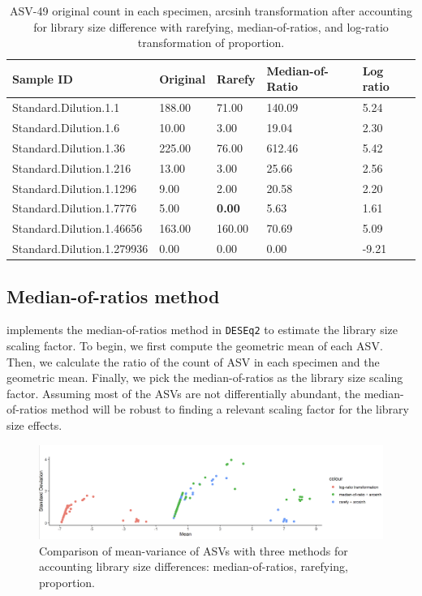 \documentclass[12pt]{article}
\begin{document}
\begin{table}[ht]
\caption{ASV-49 original count in each specimen, arcsinh transformation after accounting for library size difference with rarefying, median-of-ratios, and log-ratio transformation of proportion.}
\centering
\begin{tabular}{lllll}
  \hline
 Sample ID & Original & Rarefy & Median-of-Ratio & Log ratio \\ 
  \hline
Standard.Dilution.1.1 & 188.00 & 71.00 & 140.09 & 5.24 \\ 
  Standard.Dilution.1.6 & 10.00 & 3.00 & 19.04 & 2.30 \\ 
  Standard.Dilution.1.36 & 225.00 & 76.00 & 612.46 & 5.42 \\ 
  Standard.Dilution.1.216 & 13.00 & 3.00 & 25.66 & 2.56 \\ 
  Standard.Dilution.1.1296 & 9.00 & 2.00 & 20.58 & 2.20 \\ 
  Standard.Dilution.1.7776 & 5.00 & \textbf{0.00} & 5.63 & 1.61 \\ 
  Standard.Dilution.1.46656 & 163.00 & 160.00 & 70.69 & 5.09 \\ 
  Standard.Dilution.1.279936 & 0.00 & 0.00 & 0.00 & -9.21 \\ 
   \hline
\end{tabular}
\label{tab:rare_zero}
\end{table}

\subsection{Median-of-ratios method}

\cite{love2014moderated} implements the median-of-ratios method in \texttt{DESEq2} to estimate the library size scaling factor. To begin, we first compute the geometric mean of each ASV. Then, we calculate the ratio of the count of ASV in each specimen and the geometric mean. Finally, we pick the median-of-ratios as the library size scaling factor. Assuming most of the ASVs are not differentially abundant, the median-of-ratios method will be robust to finding a relevant scaling factor for the library size effects. 

\begin{figure}[H]
	\centering
	\includegraphics[width=\textwidth]{comparison.png}
	\caption{Comparison of mean-variance of ASVs with three methods for accounting library size differences: median-of-ratios, rarefying, proportion.}
	\label{fig:lib}
\end{figure}
\end{document}
